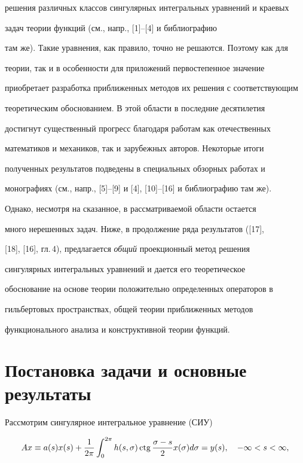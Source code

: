 решения различных классов сингулярных интегральных уравнений и краевых


задач теории функций (см., напр., [1]--[4] и библиографию 


там же). Такие уравнения, как правило, точно не решаются. Поэтому как для


теории, так и в особенности для приложений первостепенное значение


приобретает разработка приближенных методов их решения с соответствующим


теоретическим обоснованием. В этой области в последние десятилетия


достигнут существенный прогресс благодаря работам как отечественных


математиков и механиков, так и зарубежных авторов. Некоторые итоги


полученных результатов подведены в специальных обзорных работах и


монографиях (см., напр., [5]--[9] и [4], [10]--[16] и библиографию там же).





Однако, несмотря на сказанное, в рассматриваемой области остается


много нерешенных задач. Ниже, в продолжение ряда результатов ([17],


[18], [16], гл.\,4), предлагается {\it общий} проекционный метод решения


сингулярных интегральных уравнений и дается его теоретическое


обоснование на основе теории положительно определенных операторов в


гильбертовых пространствах, общей теории приближенных методов


функционального анализа и конструктивной теории функций.








\section{Постановка задачи и основные результаты}





Рассмотрим сингулярное интегральное уравнение (СИУ)


\begin{equation}


Ax\equiv a(s)x(s)+\frac{1}{2\pi}\int_{0}^{2\pi}h(s,\sigma)\ctg


\frac{\si-s}{2}x(\si)d\si = y(s),\quad -\infty<s<\infty,


\end{equation}


